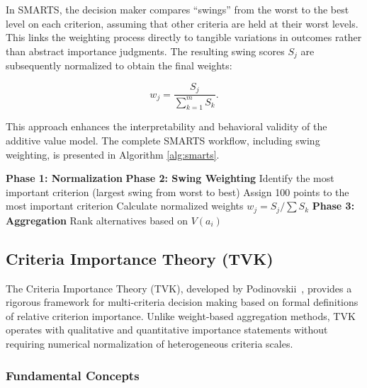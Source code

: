 \documentclass[conference]{IEEEtran}
\begin{document}
In SMARTS, the decision maker compares ``swings'' from the worst to the best level on each criterion, assuming that other criteria are held at their worst levels. This links the weighting process directly to tangible variations in outcomes rather than abstract importance judgments. The resulting swing scores $S_j$ are subsequently normalized to obtain the final weights:

\begin{equation}
	w_j = \frac{S_j}{\sum_{k=1}^{m} S_k}.
	\label{eq:smarts_weights}
\end{equation}

\noindent This approach enhances the interpretability and behavioral validity of the additive value model. The complete SMARTS workflow, including swing weighting, is presented in Algorithm \ref{alg:smarts}.

\begin{algorithm}
	\caption{SMARTS Evaluation Procedure with Swing Weighting}
	\label{alg:smarts}
	\SetAlgoLined
	\textbf{Phase 1: Normalization}\;
	\textbf{Phase 2: Swing Weighting}\;
	Identify the most important criterion (largest swing from worst to best)\;
	Assign 100 points to the most important criterion\;
	Calculate normalized weights $w_j = S_j / \sum S_k$\;
	\textbf{Phase 3: Aggregation}\;
	Rank alternatives based on $V(a_i)$\;
\end{algorithm}
\subsection{Criteria Importance Theory (TVK)}

The Criteria Importance Theory (TVK), developed by Podinovskii~\cite{podinovskii2019idei}, provides a rigorous framework for multi-criteria decision making based on formal definitions of relative criterion importance. Unlike weight-based aggregation methods, TVK operates with qualitative and quantitative importance statements without requiring numerical normalization of heterogeneous criteria scales.

\subsubsection{Fundamental Concepts}
\end{document}

